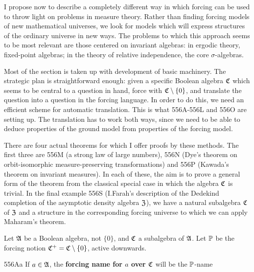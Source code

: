 
\def\chaptername{Forcing}
\def\sectionname{Forcing with Boolean subalgebras}


I propose
now to describe a completely different way in which forcing can be
used to throw light on problems in measure theory.   Rather than finding
forcing models of new mathematical universes, we look for models which will
express structures of the ordinary universe in new ways.   The problems to
which this approach seems to be most relevant are those centered on
invariant algebras:  in ergodic theory, fixed-point algebras;  in the
theory of relative independence, the core $\sigma$-algebras.

Most of the section is taken up with development of basic machinery.
The strategic plan is straightforward enough:  given a
specific Boolean algebra
$\frak C$ which seems to be central to a question in hand, force with
$\frak C\setminus\{0\}$, and translate the question into a question
in the forcing language.   In order to do this, we need an efficient scheme
for automatic translation.   This is what
556A-556L %
and 556O are setting up.   The translation has to work both ways, since we
need to be able to deduce properties of the ground model from properties of
the forcing model.

There are four actual theorems for which I offer proofs by these methods.
The first three are 556M
(a strong law of large numbers), 556N (Dye's theorem on orbit-isomorphic
measure-preserving transformations) and
556P (Kawada's theorem on invariant measures).   In each of these,
the aim is
to prove a general form of the theorem from the classical special case in
which the algebra $\frak C$ is trivial.   In the final example 556S
(I.Farah's description of the Dedekind completion of the asymptotic density
algebra $\frak Z$), we have a natural subalgebra $\frak C$
of $\frak Z$ and a structure in the corresponding
forcing universe to which we can apply Maharam's theorem.

Let $\frak A$ be a Boolean algebra, not $\{0\}$, and
$\frak C$ a subalgebra of $\frak A$.   Let $\Bbb P$ be the forcing notion
$\frak C^+=\frak C\setminus\{0\}$, active downwards.

\spheader 556Aa If $a\in\frak A$, the
{\bf forcing name for $a$ over $\frak C$} will be the $\Bbb P$-name

